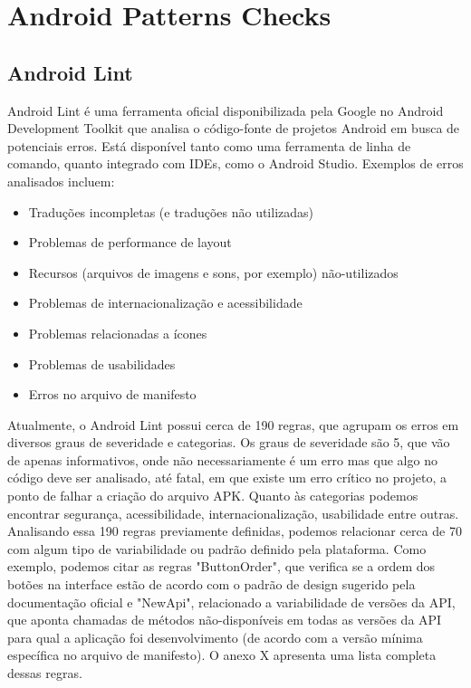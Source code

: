 \chapter{Android Patterns Checks}

\section{Android Lint}

Android Lint é uma ferramenta oficial disponibilizada pela Google no Android 
Development Toolkit que analisa o código-fonte de projetos Android em busca de 
potenciais erros. Está disponível tanto como uma ferramenta de linha de comando, 
quanto integrado com IDEs, como o Android Studio. Exemplos de erros analisados incluem:

\begin{itemize}
  \item{Traduções incompletas (e traduções não utilizadas)}
  \item{Problemas de performance de layout}
  \item{Recursos (arquivos de imagens e sons, por exemplo) não-utilizados}
  \item{Problemas de internacionalização e acessibilidade}
  \item{Problemas relacionadas a ícones}
  \item{Problemas de usabilidades}
  \item{Erros no arquivo de manifesto}
\end{itemize}

Atualmente, o Android Lint possui cerca de 190 regras, que agrupam os erros em 
diversos graus de severidade e categorias. Os graus de severidade são 5, que vão 
de apenas informativos, onde não necessariamente é um erro mas que algo no código 
deve ser analisado, até fatal, em que existe um erro crítico no projeto, a ponto 
de falhar a criação do arquivo APK. Quanto às categorias podemos encontrar segurança, 
acessibilidade, internacionalização, usabilidade entre outras. Analisando essa 190 
regras previamente definidas, podemos relacionar cerca de 70 com algum tipo de 
variabilidade ou padrão definido pela plataforma. Como exemplo, podemos citar as 
regras "ButtonOrder", que verifica se a ordem dos botões na interface estão de 
acordo com o padrão de design sugerido pela documentação oficial e "NewApi", 
relacionado a variabilidade de versões da API, que aponta chamadas de métodos 
não-disponíveis em todas as versões da API para qual a aplicação foi desenvolvimento 
(de acordo com a versão mínima específica no arquivo de manifesto). O anexo X 
apresenta uma lista completa dessas regras. %

